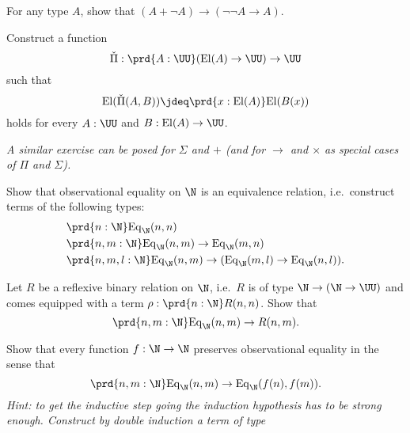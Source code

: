 \begin{exercises}
\item For any type $A$, show that $(A+\neg A)\to(\neg\neg A\to A)$. 
\item Construct a function
\begin{equation*}
\check{\Pi}:\prd{A:\UU} (\mathrm{El}(A)\to\UU)\to \UU
\end{equation*}
such that
\begin{equation*}
\mathrm{El}(\check{\Pi}(A,B))\jdeq \prd{x:\mathrm{El}(A)}\mathrm{El}(B(x))
\end{equation*}
holds for every $A:\UU$ and $B:\mathrm{El}(A)\to\UU$. 

\emph{A similar exercise can be posed for $\Sigma$ and $+$ (and for $\to$ and $\times$ as special cases of $\Pi$ and $\Sigma$).}
\item \label{ex:obs_nat_eqrel}Show that observational equality on $\N$ is an equivalence relation, i.e.~construct terms of the following types:
\begin{align*}
& \prd{n:\N} \mathrm{Eq}_\N(n,n) \\
& \prd{n,m:\N} \mathrm{Eq}_\N(n,m)\to \mathrm{Eq}_\N(m,n) \\
& \prd{n,m,l:\N} \mathrm{Eq}_\N(n,m)\to (\mathrm{Eq}_\N(m,l)\to \mathrm{Eq}_\N(n,l)).
\end{align*}
\item \label{ex:obs_nat_least}Let $R$ be a reflexive binary relation on $\N$, i.e.~$R$ is of type $\N\to (\N\to\UU)$ and comes equipped with a term $\rho:\prd{n:\N}R(n,n)$. Show that
\begin{equation*}
\prd{n,m:\N} \mathrm{Eq}_\N(n,m)\to R(n,m).
\end{equation*}
\item {}Show that every function $f:\N\to \N$ preserves observational equality in the sense that
\begin{equation*}
\prd{n,m:\N} \mathrm{Eq}_\N(n,m)\to \mathrm{Eq}_\N(f(n),f(m)).
\end{equation*}
\emph{Hint: to get the inductive step going the induction hypothesis has to be strong enough. Construct by double induction a term of type}
\begin{equation*}

\end{equation*}
\end{exercises}
